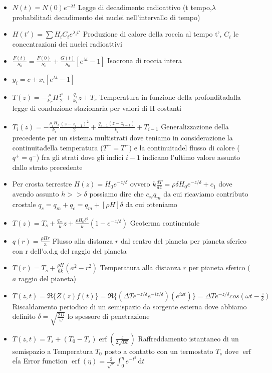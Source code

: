 \documentclass[a4paper]{article}
\DeclareMathOperator \erf{erf} %
\begin{document}
\begin{itemize}
	\item $N(t) = N(0) e^{-\lambda t}$ Legge di decadimento radioattivo (t tempo,$\lambda$ probabilita\' di decadimento dei nuclei nell'intervallo di tempo)
	\item $H(t')= \sum H_i C_i e^{\lambda_i t'} $ Produzione di calore della roccia al tempo t', $C_i$ le concentrazioni dei nuclei radioattivi
	\item $\frac{F(t)}{S_0}=\frac{F(0)}{S_0}+\frac{G(t)}{S_0}[e^{\lambda t}-1]$ Isocrona di roccia intera
	\item $y_i=c+x_i[e^{\lambda t}-1]$
	\item $T(z)=-\frac{\rho}{k_T}H \frac{z^2}{2}+ \frac{q_s}{k_T}z+T_s$ Temperatura in funzione della profondita\' dalla legge di conduzione stazionaria per valori di H costanti
	\item $T_i(z)=-\frac{\rho_i H_i}{k_i} \frac{(z-z_{i-1})^2}{2} + \frac{q_{i-1}(z-z_{i-1})}{k_i}+T_{i - 1}$ Generalizzazione della precedente per un sistema multistrati dove teniamo in considerazione la continuita\' della temperatura ($T^+=T^-$) e la continuita\' del flusso di calore ($q^+=q^-$) fra gli strati dove gli indici $i-1$ indicano l'ultimo valore assunto dallo strato precedente
	\item Per crosta terrestre $H(z)=H_0 e^{-z/\delta} $ ovvero $k\frac{dT}{dz}=\rho \delta H_0 e^{-z/\delta}+c_1$ dove avendo assunto $h>>\delta$ possiamo dire che $c_ \approx q_m$ da cui ricaviamo contributo crostale $q_s=q_m+q_c=q_m+[\rho H] \delta$ da cui otteniamo
	\item $T(z)=T_s+\frac{q_m}{k} z+\frac{\rho H_0 \delta^2}{k} (1-e^{-z/\delta})$ Geoterma continentale
	\item $q(r)=\frac{\rho H r}{3}$ Flusso alla distanza $r$ dal centro del pianeta per pianeta sferico con r dell'o.d.g del raggio del pianeta
	\item $T(r)=T_s+\frac{\rho H}{6 k}(a^2-r^2)$ Temperatura alla distanza $r$ per pianeta sferico ($a$ raggio del pianeta)
	\item $T(z,t)=\Re \{Z(z)f(t)\} = \Re \{(\Delta T e^{-z/\delta}e^{-iz/\delta})(e^{i \omega t})\} =
	\Delta T e^{-z/\delta} cos(\omega t - \frac{z}{\delta})$ Riscaldamento periodico di un semispazio da sorgente esterna dove abbiamo definito $\delta = \sqrt{\frac{2D}{\omega}}$ lo spessore di penetrazione
	\item $T(z,t) = T_s + (T_0 - T_s) \erf(\frac{z}{2 \sqrt{Dt}})$ Raffreddamento istantaneo di un semispazio a Temperatura $T_0$ posto a contatto con un termostato $T_s$ dove $\erf$ e\' la Error function $\erf (\eta)= \frac{2}{\sqrt{\pi}}\int_0^\eta e^{-t^2}\,\mathrm dt$

\end{itemize}
\end{document}
